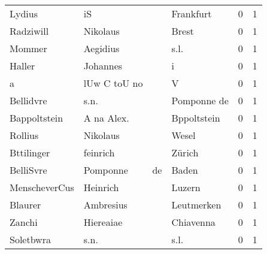 \begin{center}
\begin{tiny}
\begin{longtabu}{llllrr}
                   Lydius &                                 iS &             &                                   Frankfurt &          0 &         1 \\
                Radziwill &                           Nikolaus &             &                                       Brest &          0 &         1 \\
                   Mommer &                           Aegidius &             &                                        s.l. &          0 &         1 \\
                   Haller &                           Johannes &             &                                           i &          0 &         1 \\
                        a &                       lUw C toU no &             &                                           V &          0 &         1 \\
                Bellidvre &                               s.n. &             &                                 Pomponne de &          0 &         1 \\
             Bappoltstein &                         A na Alex. &             &                                 Bppoltstein &          0 &         1 \\
                  Rollius &                           Nikolaus &             &                                       Wesel &          0 &         1 \\
               Bttilinger &                           feinrich &             &                                      Zürich &          0 &         1 \\
                BelliSvre &                           Pomponne &          de &                                       Baden &          0 &         1 \\
            MenscheverCus &                           Heinrich &             &                                      Luzern &          0 &         1 \\
                  Blaurer &                          Ambresius &             &                                  Leutmerken &          0 &         1 \\
                   Zanchi &                          Hiereaiae &             &                                   Chiavenna &          0 &         1 \\
                Soletbwra &                               s.n. &             &                                        s.l. &          0 &         1 \\

\end{longtabu}
\end{tiny}
\end{center}
